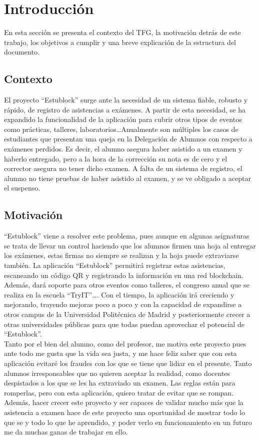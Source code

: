 \chapter{Introducción}
\label{cap:Introduccion}

En esta sección se presenta el contexto del TFG, la motivación detrás de este trabajo, los objetivos a cumplir y una breve explicación de la estructura del documento.

\section{Contexto}

El proyecto ``Estublock'' surge ante la necesidad de un sistema fiable, robusto y rápido, de registro de asistencias a exámenes. A partir de esta necesidad, se ha expandido la funcionalidad de la aplicación para cubrir otros tipos de eventos como prácticas, talleres, laboratorios\dots Anualmente son múltiples los casos de estudiantes que presentan una queja en la Delegación de Alumnos con respecto a exámenes perdidos. Es decir, el alumno asegura haber asistido a un examen y haberlo entregado, pero a la hora de la corrección su nota es de cero y el corrector asegura no tener dicho examen. A falta de un sistema de registro, el alumno no tiene pruebas de haber asistido al examen, y se ve obligado a aceptar el suspenso.

\section{Motivación}

``Estublock'' viene a resolver este problema, pues aunque en algunas asignaturas se trata de llevar un control haciendo que los alumnos firmen una hoja al entregar los exámenes, estas firmas no siempre se realizan y la hoja puede extraviarse también. La aplicación ``Estublock'' permitirá registrar estas asistencias, escaneando un código QR y registrando la información en una red blockchain. Además, dará soporte para otros eventos como talleres, el congreso anual que se realiza en la escuela ``TryIT''\dots. Con el tiempo, la aplicación irá creciendo y mejorando, trayendo mejoras poco a poco y con la capacidad de expandirse a otros campus de la Universidad Politécnica de Madrid y posteriormente crecer a otras universidades públicas para que todas puedan aprovechar el potencial de ``Estublock''. \\

Tanto por el bien del alumno, como del profesor, me motiva este proyecto pues ante todo me gusta que la vida sea justa, y me hace feliz saber que con esta aplicación evitaré los fraudes con los que se tiene que lidiar en el presente. Tanto alumnos irresponsables que no quieren aceptar la realidad, como docentes despistados a los que se les ha extraviado un examen. Las reglas están para romperlas, pero con esta aplicación, quiero tratar de evitar que se rompan. Además, hacer crecer este proyecto y ser capaces de validar mucho más que la asistencia a examen hace de este proyecto una oportunidad de mostrar todo lo que se y todo lo que he aprendido, y poder verlo en funcionamiento en un futuro me da muchas ganas de trabajar en ello. \\

